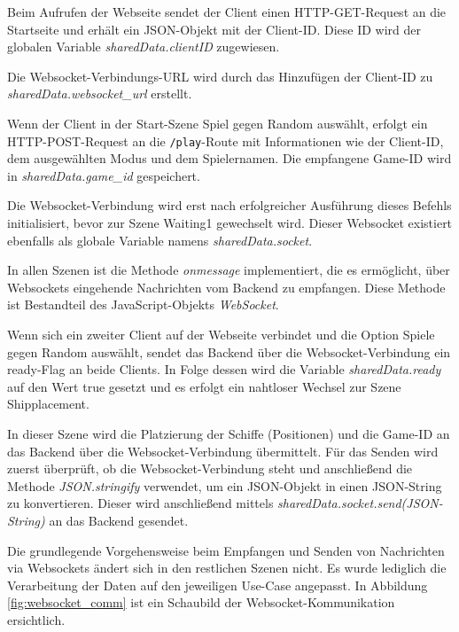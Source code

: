 \documentclass[a4paper, 10pt, conference]{IEEEtran}
\begin{document}
Beim Aufrufen der Webseite sendet der Client einen HTTP-GET-Request an die Startseite und erhält ein JSON-Objekt mit der Client-ID. Diese ID wird der globalen Variable \textit{sharedData.clientID} zugewiesen.

Die Websocket-Verbindungs-URL wird durch das Hinzufügen der Client-ID zu \textit{sharedData.websocket\_url} erstellt.

Wenn der Client in der Start-Szene \glqq Spiel gegen Random\grqq{} auswählt, erfolgt ein HTTP-POST-Request an die \texttt{/play}-Route mit Informationen wie der Client-ID, dem ausgewählten Modus und dem Spielernamen. Die empfangene Game-ID wird in \textit{sharedData.game\_id} gespeichert.

Die Websocket-Verbindung wird erst nach erfolgreicher Ausführung dieses Befehls initialisiert, bevor zur Szene \glqq Waiting1\grqq{} gewechselt wird. Dieser Websocket existiert ebenfalls als globale Variable namens \textit{sharedData.socket}.

In allen Szenen ist die Methode \textit{onmessage} implementiert, die es ermöglicht, über Websockets eingehende Nachrichten vom Backend zu empfangen. Diese Methode ist Bestandteil des JavaScript-Objekts \textit{WebSocket}.

Wenn sich ein zweiter Client auf der Webseite verbindet und die Option \glqq Spiele gegen Random\grqq{} auswählt, sendet das Backend über die Websocket-Verbindung ein \glqq ready\grqq{}-Flag an beide Clients. In Folge dessen wird die Variable \textit{sharedData.ready} auf den Wert \glqq true\grqq{} gesetzt und es erfolgt ein nahtloser Wechsel zur Szene \glqq Shipplacement\grqq{}.

In dieser Szene wird die Platzierung der Schiffe (Positionen) und die Game-ID an das Backend über die Websocket-Verbindung übermittelt. Für das Senden wird zuerst überprüft, ob die Websocket-Verbindung steht und anschließend die Methode \textit{JSON.stringify} verwendet, um ein JSON-Objekt in einen JSON-String zu konvertieren. Dieser wird anschließend mittels \textit{sharedData.socket.send(JSON-String)} an das Backend gesendet.

 Die grundlegende Vorgehensweise beim Empfangen und Senden von Nachrichten via Websockets ändert sich in den restlichen Szenen nicht. Es wurde lediglich die Verarbeitung der Daten auf den jeweiligen Use-Case angepasst. In Abbildung \ref{fig:websocket_comm} ist ein Schaubild der Websocket-Kommunikation ersichtlich.
\end{document}
